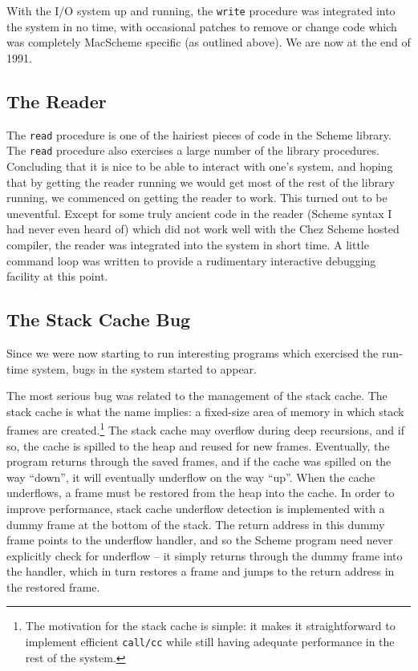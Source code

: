 With the I/O system up and running, the {\tt write} procedure was integrated
into the system in no time, with occasional patches to remove or change code
which was completely MacScheme specific (as outlined above). We are now at
the end of 1991.

\subsection{The Reader}

The {\tt read} procedure is one of the hairiest pieces of code in the Scheme
library. The {\tt read} procedure also exercises a large number of the
library procedures. Concluding that it is nice to be able to interact with
one's system, and hoping that by getting the reader running we would get
most of the rest of the library running, we commenced on getting the reader
to work. This turned out to be uneventful.  Except for some truly ancient
code in the reader (Scheme syntax I had never even heard of) which did not
work well with the Chez Scheme hosted compiler, the reader was integrated into
the system in short time.  A little command loop was written to provide a
rudimentary interactive debugging facility at this point.

\subsection{The Stack Cache Bug}

Since we were now starting to run interesting programs which exercised
the run-time system, bugs in the system started to appear. 

The most serious bug was related to the management of the stack cache.  The
stack cache is what the name implies: a fixed-size area of memory in which
stack frames are created.\footnote{The motivation for the stack cache is
simple: it makes it straightforward to implement efficient {\tt call/cc}
while still having adequate performance in the rest of the system.} The
stack cache may overflow during deep recursions, and if so, the cache is
spilled to the heap and reused for new frames. Eventually, the program
returns through the saved frames, and if the cache was spilled on the way
``down'', it will eventually underflow on the way ``up''.  When the cache
underflows, a frame must be restored from the heap into the cache. In order
to improve performance, stack cache underflow detection is implemented with
a dummy frame at the bottom of the stack. The return address in this dummy
frame points to the underflow handler, and so the Scheme program need never
explicitly check for underflow -- it simply returns through the dummy frame
into the handler, which in turn restores a frame and jumps to the return
address in the restored frame.


